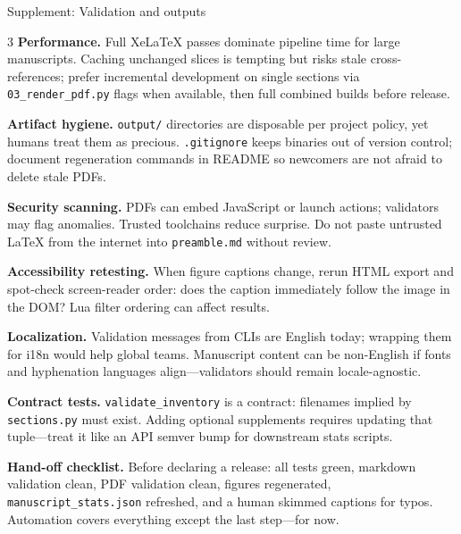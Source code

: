 \documentclass[
  ignorenonframetext,
]{beamer}
\begin{document}
\begin{frame}[fragile]{Supplement: Validation and outputs}
\begin{multicols}{3}
\textbf{Performance.} Full XeLaTeX passes dominate pipeline time for
large manuscripts. Caching unchanged slices is tempting but risks stale
cross-references; prefer incremental development on single sections via
\texttt{03\_render\_pdf.py} flags when available, then full combined
builds before release.

\textbf{Artifact hygiene.} \texttt{output/} directories are disposable
per project policy, yet humans treat them as precious.
\texttt{.gitignore} keeps binaries out of version control; document
regeneration commands in README so newcomers are not afraid to delete
stale PDFs.

\textbf{Security scanning.} PDFs can embed JavaScript or launch actions;
validators may flag anomalies. Trusted toolchains reduce surprise. Do
not paste untrusted LaTeX from the internet into \texttt{preamble.md}
without review.

\textbf{Accessibility retesting.} When figure captions change, rerun
HTML export and spot-check screen-reader order: does the caption
immediately follow the image in the DOM? Lua filter ordering can affect
results.

\textbf{Localization.} Validation messages from CLIs are English today;
wrapping them for i18n would help global teams. Manuscript content can
be non-English if fonts and hyphenation languages align---validators
should remain locale-agnostic.

\textbf{Contract tests.} \texttt{validate\_inventory} is a contract:
filenames implied by \texttt{sections.py} must exist. Adding optional
supplements requires updating that tuple---treat it like an API semver
bump for downstream stats scripts.

\textbf{Hand-off checklist.} Before declaring a release: all tests
green, markdown validation clean, PDF validation clean, figures
regenerated, \texttt{manuscript\_stats.json} refreshed, and a human
skimmed captions for typos. Automation covers everything except the last
step---for now.

\end{multicols}
\end{frame}
\end{document}
